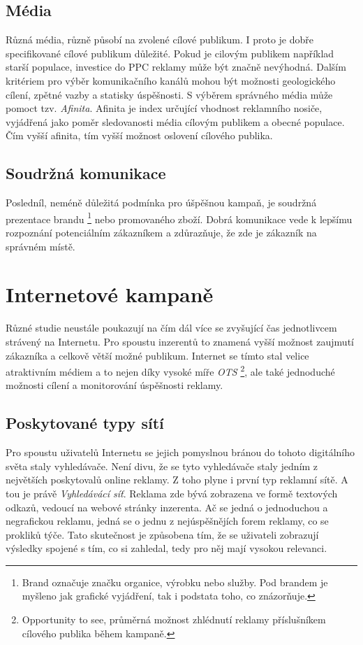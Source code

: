 \subsection{Média}
Různá média, různě působí na zvolené cílové publikum. I proto je dobře specifikované cílové publikum důležité. Pokud je cilovým publikem například starší populace, investice
do PPC reklamy může být značně nevýhodná. Dalším kritériem pro výběr komunikačního kanálů mohou být možnosti geologického cílení, zpětné vazby a statisky úspěšnosti.
S výběrem správného média může pomoct tzv. \emph{Afinita}. Afinita je index určující vhodnost reklamního nosiče, vyjádřená jako poměr sledovanosti média cílovým publikem
a obecné populace. Čím vyšší afinita, tím vyšší možnost oslovení cílového publika.

\subsection{Soudržná komunikace}
Posledníl, neméně důležitá podmínka pro úšpěšnou kampaň, je soudržná prezentace brandu
\footnote{Brand označuje značku organice, výrobku nebo služby. Pod brandem je myšleno jak grafické vyjádření, tak i podstata toho, co znázorňuje.}
nebo promovaného zboží. Dobrá komunikace vede k lepšímu rozpoznání potenciálním zákazníkem a zdůrazňuje, že zde je zákazník na správném místě.

\section{Internetové kampaně}
Různé studie neustále poukazují na čím dál více se zvyšující čas jednotlivcem strávený na Internetu. Pro spoustu inzerentů to znamená vyšší možnost
zaujmutí zákazníka a celkově větší možné publikum. Internet se tímto stal velice atraktivním médiem a to nejen díky vysoké míře \emph{OTS}
\footnote{Opportunity to see, průměrná možnost zhlédnutí reklamy příslušníkem cílového publika během kampaně.},
ale také jednoduché možnosti cílení a monitorování úspěšnosti reklamy.


\subsection{Poskytované typy sítí}
Pro spoustu uživatelů Internetu se jejich pomyslnou bránou do tohoto digitálního světa staly vyhledávače. Není divu, že se tyto vyhledávače staly jedním z největších
poskytovalů online reklamy. Z toho plyne i první typ reklamní sítě. A tou je právě \emph{Vyhledávácí síť}. Reklama zde bývá zobrazena ve formě textových odkazů,
vedoucí na webové stránky inzerenta. Ač se jedná o jednoduchou a negrafickou reklamu, jedná se o jednu z nejúspěšnějích forem reklamy, co se prokliků týče. Tato skutečnost
je způsobena tím, že se uživateli zobrazují výsledky spojené s tím, co si zahledal, tedy pro něj mají vysokou relevanci.

